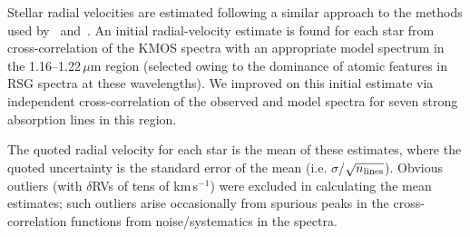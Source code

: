 \documentclass[useAMS,usenatbib]{mn2e}
\def\kms{$\mbox{km s}^{-1}$}
\begin{document}

Stellar radial velocities are estimated following a similar approach to the methods used by~\citet{2015ApJ...798...23L} and~\citet{2015ApJ...803...14P}. An initial radial-velocity estimate is found for each star from cross-correlation of the KMOS spectra with an appropriate model spectrum in the 1.16--1.22\,$\mu$m region
(selected owing to the dominance of atomic features in RSG spectra at these wavelengths).
We improved on this initial estimate via independent cross-correlation of the observed and model spectra for seven strong absorption lines in this region.

The quoted radial velocity for each star is the mean of these estimates, where the quoted uncertainty is the standard error of the mean
(i.e. $\sigma$/$\sqrt{n_{\rm lines}}$).
Obvious outliers (with $\delta$RVs of tens of km\,s$^{-1}$) were excluded in calculating the mean estimates; such outliers arise occasionally from spurious peaks in the cross-correlation functions from noise/systematics in the spectra.



\end{document}
